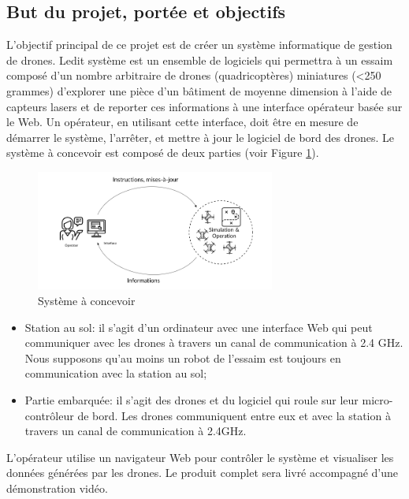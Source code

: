 \documentclass{mistcoursedoc}
\begin{document}
\subsection{But du projet, portée et objectifs}

\par L'objectif principal de ce projet est de créer un système informatique de gestion de drones.
Ledit système est un ensemble de logiciels qui permettra à un essaim composé d’un nombre arbitraire de drones (quadricoptères) miniatures (<250 grammes) d’explorer une pièce d’un bâtiment de moyenne dimension à l'aide de capteurs lasers et de reporter ces informations à une interface opérateur basée sur le Web.
Un opérateur, en utilisant cette interface, doit être en mesure de démarrer le système, l’arrêter, et mettre à jour le logiciel de bord des drones. Le système à concevoir est composé de deux parties (voir Figure \ref{fig:systeme}).

\begin{figure}[h!]
  \centering\includegraphics[width=0.7\textwidth]{systeme.png}
  \caption{Système à concevoir}
  \label{fig:systeme}
\end{figure}

\begin{itemize}
    \item Station au sol: il s’agit d’un ordinateur avec une interface Web qui peut communiquer avec les drones à travers un canal de communication à 2.4 GHz. Nous supposons qu’au moins un robot de l’essaim est toujours en communication avec la station au sol;
    \item Partie embarquée: il s’agit des drones et du logiciel qui roule sur leur micro-contrôleur de bord. Les drones communiquent entre eux et avec la station à travers un canal de communication à 2.4GHz. 
\end{itemize}

L’opérateur utilise un navigateur Web pour contrôler le système et visualiser les données générées par les drones. Le produit complet sera livré accompagné d’une démonstration vidéo.
\end{document}
